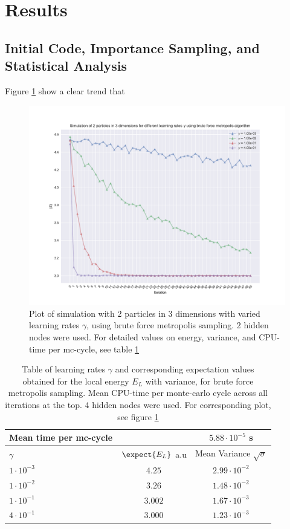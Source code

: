 \section{Results}
\subsection{Initial Code, Importance Sampling, and Statistical Analysis}
Figure \ref{fig:naive-nin} show a clear trend that

\begin{figure}[h]
\hspace{-2.8cm}
\includegraphics[width = \paperwidth]{figures/naive_2p_3d.pdf}
\caption{Plot of simulation with 2 particles in 3 dimensions with varied learning rates $\gamma$, using brute force metropolis sampling.
			2 hidden nodes were used.
			For detailed values on energy, variance, and CPU-time per mc-cycle, see table \ref{tab:naive-nin}}
\label{fig:naive-nin}
\end{figure}

\begin{table}[h]
\begin{tabular}{l c c}
	Mean time per mc-cycle & &$5.88\cdot10^{-5}$ s \\
	\hline
	$\gamma$ & $\expect{E_L}$ a.u & Mean Variance $\sqrt{\sigma}$\\
	\hline
	$1\cdot10^{-3}$ & $4.25$ & $2.99\cdot10^{-2}$ \\
	$1\cdot10^{-2}$ & $3.26$ & $1.48\cdot10^{-2}$ \\
	$1\cdot10^{-1}$ & $3.002$ & $1.67\cdot10^{-3}$ \\
	$4\cdot10^{-1}$ & $3.000$ & $1.23\cdot10^{-3}$ \\
\end{tabular}
\label{tab:naive-nin}
\caption{Table of learning rates $\gamma$ and corresponding expectation values obtained for the local energy $E_L$ with variance, for brute force metropolis sampling.
		Mean CPU-time per monte-carlo cycle across all iterations at the top. 4 hidden nodes were used.
	For corresponding plot, see figure \ref{fig:naive-nin}}
\end{table}

